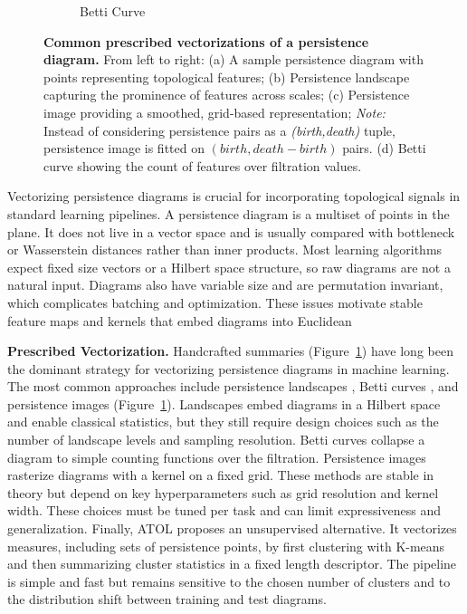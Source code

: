 \begin{figure}[t]
\begin{subfigure}[b]{0.23\textwidth}
        \caption{Betti Curve}
    \end{subfigure}
    \caption{\textbf{Common prescribed vectorizations of a persistence diagram.} From left to right: (a) A sample persistence diagram with points representing topological features; (b) Persistence landscape capturing the prominence of features across scales; (c) Persistence image providing a smoothed, grid-based representation; \textit{Note:} Instead of considering persistence pairs as a \textit{(birth,death)} tuple, persistence image is fitted on $(birth, death-birth)$ pairs. (d) Betti curve showing the count of features over filtration values.}
    \label{fig:ph-vectorizations}
\end{figure}

Vectorizing persistence diagrams is crucial for incorporating topological signals in standard learning pipelines. A persistence diagram is a multiset of points in the plane. It does not live in a vector space and is usually compared with bottleneck or Wasserstein distances rather than inner products. Most learning algorithms expect fixed size vectors or a Hilbert space structure, so raw diagrams are not a natural input. Diagrams also have variable size and are permutation invariant, which complicates batching and optimization. These issues motivate stable feature maps and kernels that embed diagrams into Euclidean 

\textbf{Prescribed Vectorization.} Handcrafted summaries (Figure~\ref{fig:ph-vectorizations}) have long been the dominant strategy for vectorizing persistence diagrams in machine learning. The most common approaches include persistence landscapes \cite{persistence_landscapes}, Betti curves \cite{betti_curves}, and persistence images \cite{persistence_images} (Figure~\ref{fig:ph-vectorizations}). Landscapes embed diagrams in a Hilbert space and enable classical statistics, but they still require design choices such as the number of landscape levels and sampling resolution. Betti curves collapse a diagram to simple counting functions over the filtration. Persistence images rasterize diagrams with a kernel on a fixed grid. These methods are stable in theory but depend on key hyperparameters such as grid resolution and kernel width. These choices must be tuned per task and can limit expressiveness and generalization. Finally, ATOL \cite{atol} proposes an unsupervised alternative. It vectorizes measures, including sets of persistence points, by first clustering with K-means and then summarizing cluster statistics in a fixed length descriptor. The pipeline is simple and fast but remains sensitive to the chosen number of clusters and to the distribution shift between training and test diagrams.

